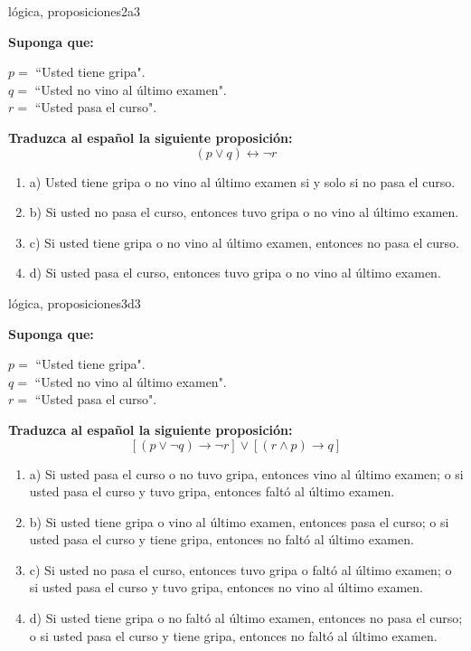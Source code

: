 \documentclass{article}
\begin{document}
\begin{question}{13}{lógica, proposiciones}{2}{a}{3}{
\textbf{Suponga que:} \medskip

\(p = \) ``Usted tiene gripa".\\
\(q = \) ``Usted no vino al último examen".\\
\(r = \) ``Usted pasa el curso". \medskip

\textbf{Traduzca al español la siguiente proposición:}
\[
(p \lor q) \leftrightarrow \neg r
\]

\begin{enumerate}
   \item a) Usted tiene gripa o no vino al último examen si y solo si no pasa el curso.  
   \item b) Si usted no pasa el curso, entonces tuvo gripa o no vino al último examen.  
   \item c) Si usted tiene gripa o no vino al último examen, entonces no pasa el curso.  
   \item d) Si usted pasa el curso, entonces tuvo gripa o no vino al último examen.  
\end{enumerate}
}
\end{question}

\begin{question}{14}{lógica, proposiciones}{3}{d}{3}{
\textbf{Suponga que:} \medskip

\(p = \) ``Usted tiene gripa".\\
\(q = \) ``Usted no vino al último examen".\\
\(r = \) ``Usted pasa el curso". \medskip

\textbf{Traduzca al español la siguiente proposición:}
\[
[(p \lor \neg q) \rightarrow \neg r] \lor [(r \land p) \rightarrow q]
\]

\begin{enumerate}
   \item a) Si usted pasa el curso o no tuvo gripa, entonces vino al último examen; o si usted pasa el curso y tuvo gripa, entonces faltó al último examen.  
   \item b) Si usted tiene gripa o vino al último examen, entonces pasa el curso; o si usted pasa el curso y tiene gripa, entonces no faltó al último examen.  
   \item c) Si usted no pasa el curso, entonces tuvo gripa o faltó al último examen; o si usted pasa el curso y tuvo gripa, entonces no vino al último examen.  
   \item d) Si usted tiene gripa o no faltó al último examen, entonces no pasa el curso; o si usted pasa el curso y tiene gripa, entonces no faltó al último examen.
\end{enumerate}
}
\end{question}
\end{document}
